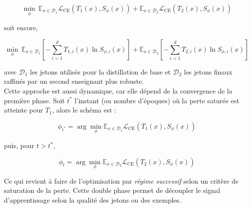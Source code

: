 \begin{equation}
\min_\phi \ \mathbb{E}_{x \in \mathcal{D}_1} \mathcal{L}_{\text{CE}}(T_1(x), S_{\phi}(x)) + \mathbb{E}_{x \in \mathcal{D}_2} \mathcal{L}_{\text{CE}}(T_2(x), S_{\phi}(x))
\end{equation}

soit encore, 

\begin{equation}
\min_\phi \ \mathbb{E}_{x \in \mathcal{D}_1} \left[ -\sum_{i=1}^{d} T_{1,i}(x) \ln S_{\phi,i}(x) \right] + \mathbb{E}_{x \in \mathcal{D}_2} \left[ -\sum_{i=1}^{d} T_{2,i}(x) \ln S_{\phi,i}(x) \right]
\end{equation}

avec $\mathcal{D}_1$ les jetons utilisés pour la distillation de base et $\mathcal{D}_2$ les jetons finaux raffinés par un second enseignant plus robuste.\\

Cette approche est aussi dynamique, car elle dépend de la convergence de la première phase. Soit $t^*$ l'instant (ou nombre d'époques) où la perte saturée est atteinte pour $T_1$, alors le schéma est :

\begin{equation}
\phi_{t^*} = \arg\min_{\phi} \mathbb{E}_{x \in \mathcal{D}_1} \mathcal{L}_{\text{CE}}(T_1(x), S_{\phi}(x))
\end{equation}

puis, pour $t > t^*$,

\begin{equation}
\phi_{t} = \arg\min_{\phi} \mathbb{E}_{x \in \mathcal{D}_2} \mathcal{L}_{\text{CE}}(T_2(x), S_{\phi}(x))
\end{equation}

Ce qui revient à faire de l'optimisation par \textit{régime successif} selon un critère de saturation de la perte. Cette double phase permet de découpler le signal d'apprentissage selon la qualité des jetons ou des exemples.

